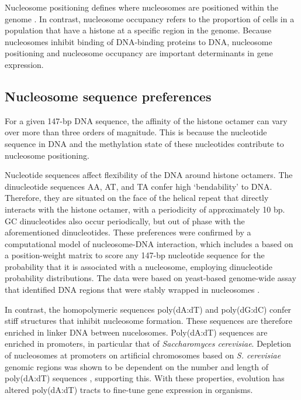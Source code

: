 \documentclass[parskip=full, numbers=noenddot]{scrreprt}
\begin{document}

Nucleosome positioning defines where nucleosomes are positioned within the genome \citep{struhl_determinants_2013}.
In contrast, nucleosome occupancy refers to the proportion of cells in a population that have a histone at a specific region in the genome. %
Because nucleosomes inhibit binding of DNA-binding proteins to DNA, nucleosome positioning and nucleosome occupancy are important determinants in gene expression. %

\subsection{Nucleosome sequence preferences}
\label{ssec:emsaselex_intro_seqpref}

For a given 147-bp DNA sequence, the affinity of the histone octamer can vary over more than three orders of magnitude.
This is because the nucleotide sequence in DNA and the methylation state of these nucleotides contribute to nucleosome positioning.

Nucleotide sequences affect flexibility of the DNA around histone octamers.  The dinucleotide sequences AA, AT, and TA confer high `bendability' to DNA.  Therefore, they are situated on the face of the helical repeat that directly interacts with the histone octamer, with a periodicity of approximately 10 bp.  GC dinucleotides also occur periodically, but out of phase with the aforementioned dinucleotides.  These preferences were confirmed by a computational model of nucleosome-DNA interaction, which includes a based on a position-weight matrix to score any 147-bp nucleotide sequence for the probability that it is associated with a nucleosome, employing dinucleotide probability distributions.  The data were based on yeast-based genome-wide assay that identified DNA regions that were stably wrapped in nucleosomes \citep{segal_genomic_2006}.

In contrast, the homopolymeric sequences poly(dA:dT) and poly(dG:dC) confer stiff structures that inhibit nucleosome formation.  These sequences are therefore enriched in linker DNA between nucelosomes.  Poly(dA:dT) sequences are enriched in promoters, in particular that of \emph{Saccharomyces cerevisiae}.  Depletion of nucleosomes at promoters on artificial chromosomes based on \emph{S. cerevisiae} genomic regions was shown to be dependent on the number and length of poly(dA:dT) sequences \citep{hughes_functional_2012}, supporting this.
With these properties, evolution has altered poly(dA:dT) tracts to fine-tune gene expression in organisms. %
\end{document}

